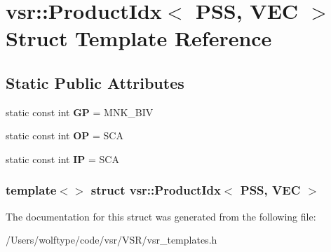 \hypertarget{structvsr_1_1_product_idx_3_01_p_s_s_00_01_v_e_c_01_4}{\section{vsr\-:\-:Product\-Idx$<$ P\-S\-S, V\-E\-C $>$ Struct Template Reference}
\label{structvsr_1_1_product_idx_3_01_p_s_s_00_01_v_e_c_01_4}
}
\subsection*{Static Public Attributes}
\begin{DoxyCompactItemize}
\item 
\hypertarget{structvsr_1_1_product_idx_3_01_p_s_s_00_01_v_e_c_01_4_accd0be7896ff94f5148bd4fb9ba2bc5b}{static const int {\bfseries G\-P} = M\-N\-K\-\_\-\-B\-I\-V}\label{structvsr_1_1_product_idx_3_01_p_s_s_00_01_v_e_c_01_4_accd0be7896ff94f5148bd4fb9ba2bc5b}

\item 
\hypertarget{structvsr_1_1_product_idx_3_01_p_s_s_00_01_v_e_c_01_4_abe39036e2e637274057395322cf6166b}{static const int {\bfseries O\-P} = S\-C\-A}\label{structvsr_1_1_product_idx_3_01_p_s_s_00_01_v_e_c_01_4_abe39036e2e637274057395322cf6166b}

\item 
\hypertarget{structvsr_1_1_product_idx_3_01_p_s_s_00_01_v_e_c_01_4_afed496d5a1521bacdd7acac7e34c065a}{static const int {\bfseries I\-P} = S\-C\-A}\label{structvsr_1_1_product_idx_3_01_p_s_s_00_01_v_e_c_01_4_afed496d5a1521bacdd7acac7e34c065a}

\end{DoxyCompactItemize}
\subsubsection*{template$<$$>$ struct vsr\-::\-Product\-Idx$<$ P\-S\-S, V\-E\-C $>$}



The documentation for this struct was generated from the following file\-:\begin{DoxyCompactItemize}
\item 
/\-Users/wolftype/code/vsr/\-V\-S\-R/vsr\-\_\-templates.\-h\end{DoxyCompactItemize}

